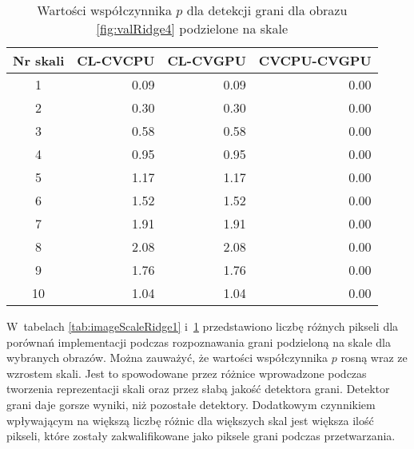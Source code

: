 \begin{center}
\begin{table}
\centering
\caption{Wartości współczynnika $ p $ dla detekcji grani dla obrazu \ref{fig:valRidge4} podzielone na skale}
\label{tab:imageScaleRidge4}
\begin{tabular}{|c|r|r|r|}
 \hline
Nr skali & CL-CVCPU & CL-CVGPU & CVCPU-CVGPU \\ \hline
1        & 0.09     & 0.09     & 0.00        \\ \hline
2        & 0.30     & 0.30     & 0.00        \\ \hline
3        & 0.58     & 0.58     & 0.00        \\ \hline
4        & 0.95     & 0.95     & 0.00        \\ \hline
5        & 1.17     & 1.17     & 0.00        \\ \hline
6        & 1.52     & 1.52     & 0.00        \\ \hline
7        & 1.91     & 1.91     & 0.00        \\ \hline
8        & 2.08     & 2.08     & 0.00        \\ \hline
9        & 1.76     & 1.76     & 0.00        \\ \hline
10       & 1.04     & 1.04     & 0.00        \\ \hline
\end{tabular}
\end{table}
\end{center}

W~tabelach \ref{tab:imageScaleRidge1} i~\ref{tab:imageScaleRidge4} przedstawiono liczbę różnych pikseli dla porównań implementacji podczas rozpoznawania grani podzieloną na skale dla wybranych obrazów. Można zauważyć, że wartości współczynnika $ p $ rosną wraz ze wzrostem skali. Jest to spowodowane przez różnice wprowadzone podczas tworzenia reprezentacji skali oraz przez słabą jakość detektora grani. Detektor grani daje gorsze wyniki, niż pozostałe detektory. Dodatkowym czynnikiem wpływającym na większą liczbę różnic dla większych skal jest większa ilość pikseli, które zostały zakwalifikowane jako piksele grani podczas przetwarzania.
